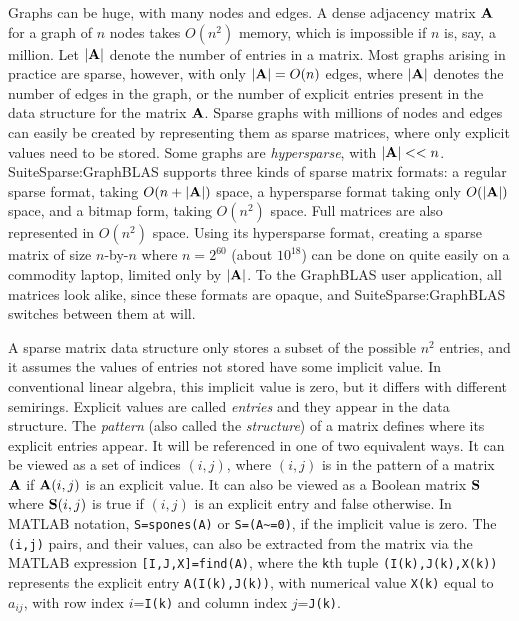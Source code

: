 \documentclass[12pt]{article}
\begin{document}
Graphs can be huge, with many nodes and edges.  A dense adjacency matrix ${\bf
A}$ for a graph of $n$ nodes takes $O(n^2)$ memory, which is impossible if $n$
is, say, a million.  Let $|{\bf A}|$ denote the number of entries in a matrix.
Most graphs arising in practice are sparse, however, with only $|{\bf A}|=O(n)$
edges, where $|{\bf A}|$ denotes the number of edges in the graph, or the
number of explicit entries present in the data structure for the matrix ${\bf
A}$.  Sparse graphs with millions of nodes and edges can easily be created by
representing them as sparse matrices, where only explicit values need to be
stored.  Some graphs are {\em hypersparse}, with ${|\bf A}| << n$.
SuiteSparse:GraphBLAS supports three kinds of sparse matrix formats: a regular
sparse format, taking $O(n+|{\bf A}|)$ space, a hypersparse format taking only
$O(|{\bf A}|)$ space, and a bitmap form, taking $O(n^2)$ space.  Full matrices
are also represented in $O(n^2)$ space.  Using its hypersparse format, creating
a sparse matrix of size $n$-by-$n$ where $n=2^{60}$ (about $10^{18}$) can be
done on quite easily on a commodity laptop, limited only by $|{\bf A}|$.
To the GraphBLAS user application, all matrices look alike, since these formats
are opaque, and SuiteSparse:GraphBLAS switches between them at will.

A sparse matrix data structure only stores a subset of the possible $n^2$
entries, and it assumes the values of entries not stored have some implicit
value.  In conventional linear algebra, this implicit value is zero, but it
differs with different semirings.  Explicit values are called {\em entries} and
they appear in the data structure.  The {\em pattern} (also called the
{\em structure}) of a matrix  defines where its explicit entries appear.  It
will be referenced in one of two equivalent ways.  It can be viewed as a set of
indices $(i,j)$, where $(i,j)$ is in the pattern of a matrix ${\bf A}$ if ${\bf
A}(i,j)$ is an explicit value.  It can also be viewed as a Boolean matrix ${\bf
S}$ where ${\bf S}(i,j)$ is true if $(i,j)$ is an explicit entry and false
otherwise.  In MATLAB notation, \verb'S=spones(A)' or \verb'S=(A~=0)', if the
implicit value is zero.  The \verb'(i,j)' pairs, and their values, can also be
extracted from the matrix via the MATLAB expression \verb'[I,J,X]=find(A)',
where the \verb'k'th tuple \verb'(I(k),J(k),X(k))' represents the explicit
entry \verb'A(I(k),J(k))', with numerical value \verb'X(k)' equal to $a_{ij}$,
with row index $i$=\verb'I(k)' and column index $j$=\verb'J(k)'.
\end{document}
